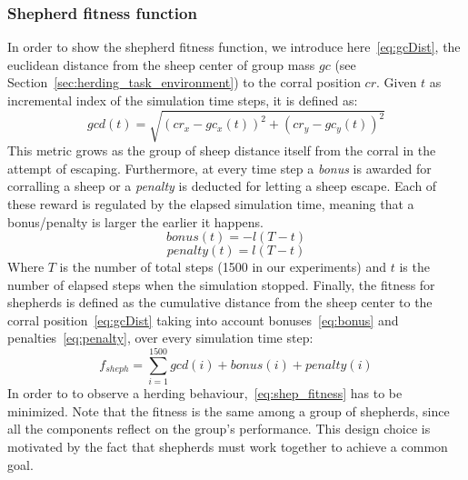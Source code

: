 \documentclass[conference]{IEEEtran}
\begin{document}
\vspace{0.5em}
\subsubsection{Shepherd fitness function}
In order to show the shepherd fitness function, we introduce here~\eqref{eq:gcDist}, the euclidean distance from the sheep center of group mass $gc$ (see Section~\ref{sec:herding_task_environment}) to the corral position $cr$.
Given $t$ as incremental index of the simulation time steps, it is defined as:
\begin{equation} \label{eq:gcDist}
gcd(t) = \sqrt{(cr_x - gc_x(t))^2 + (cr_y - gc_y(t))^2}
\end{equation}
This metric grows as the group of sheep distance itself from the corral in the attempt of escaping.
Furthermore, at every time step a \textit{bonus} is awarded for corralling a sheep or a \textit{penalty} is deducted for letting a sheep escape. 
Each of these reward is regulated by the elapsed simulation time, meaning that a bonus/penalty is larger the earlier it happens. 
\begin{equation} \label{eq:bonus}
bonus(t) = - l (T - t)
\end{equation}
\begin{equation} \label{eq:penalty}
penalty(t) = l (T - t)
\end{equation}
Where $T$ is the number of total steps (1500 in our experiments) and $t$ is the number of elapsed steps when the simulation stopped.
Finally, the fitness for shepherds is defined as the cumulative distance from the sheep center to the corral position~\eqref{eq:gcDist} taking into account bonuses~\eqref{eq:bonus} and penalties~\eqref{eq:penalty}, over every simulation time step:
\begin{equation} \label{eq:shep_fitness}
f_{sheph} = \sum_{i=1}^{1500} gcd(i)	+ bonus(i) + penalty(i)
\end{equation}
In order to to observe a herding behaviour,~\eqref{eq:shep_fitness} has to be minimized.
Note that the fitness is the same among a group of shepherds, since all the components reflect on the group's performance. 
This design choice is motivated by the fact that shepherds must work together to achieve a common goal. 

\vspace{0.5em}
\end{document}
